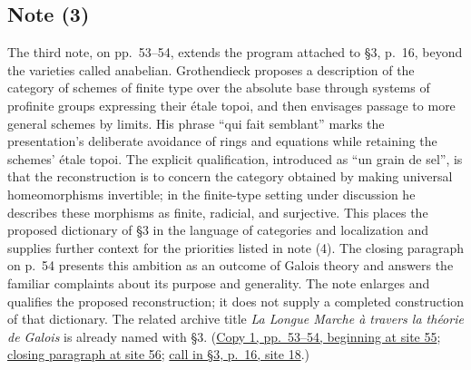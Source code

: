 \subsection*{Note (3)}
The third note, on pp.~53--54, extends the program attached to \S3,
p.~16, beyond the varieties called anabelian. Grothendieck proposes a
description of the category of schemes of finite type over the absolute
base through systems of profinite groups expressing their étale topoi,
and then envisages passage to more general schemes by limits. His phrase
``qui fait semblant'' marks the presentation's deliberate avoidance of
rings and equations while retaining the schemes' étale topoi. The
explicit qualification, introduced as ``un grain de sel'', is that the
reconstruction is to concern the category obtained by making universal
homeomorphisms invertible; in the finite-type setting under discussion
he describes these morphisms as finite, radicial, and surjective. This
places the proposed dictionary of \S3 in the language of categories and
localization and supplies further context for the priorities listed in
note (4). The closing paragraph on p.~54 presents this ambition as an
outcome of Galois theory and answers the familiar complaints about its
purpose and generality. The note enlarges and qualifies the proposed
reconstruction; it does not supply a completed construction of that
dictionary. The related archive title \emph{La Longue Marche à travers
la théorie de Galois} is already named with \S3.
(\href{https://grothendieck.umontpellier.fr/web/viewer.html?file=../119.pdf\#page=56}{Copy 1, pp.~53--54, beginning at site 55};
\href{https://grothendieck.umontpellier.fr/web/viewer.html?file=../119.pdf\#page=57}{closing paragraph at site 56};
\href{https://grothendieck.umontpellier.fr/web/viewer.html?file=../119.pdf\#page=19}{call in \S3, p.~16, site 18}.)
